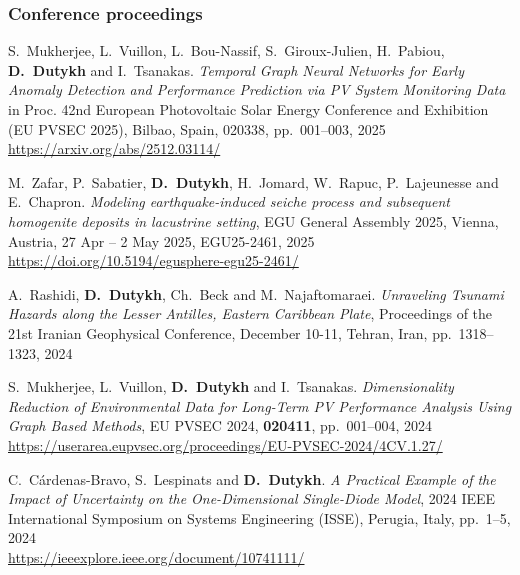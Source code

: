 \separator
\subsubsection{Conference proceedings}

\begin{etaremune}



  \item S.~Mukherjee, L.~Vuillon, L.~Bou-Nassif, S.~Giroux-Julien, H.~Pabiou, \textbf{D.~Dutykh} and I.~Tsanakas. \textit{Temporal Graph Neural Networks for Early Anomaly Detection and Performance Prediction via PV System Monitoring Data} in Proc. 42nd European Photovoltaic Solar Energy Conference and Exhibition (EU PVSEC 2025), Bilbao, Spain, 020338, pp.~001--003, 2025 \\ %
  \url{https://arxiv.org/abs/2512.03114/}

  \item M.~Zafar, P.~Sabatier, \textbf{D.~Dutykh}, H.~Jomard, W.~Rapuc, P.~Lajeunesse and E.~Chapron. \textit{Modeling earthquake-induced seiche process and subsequent homogenite deposits in lacustrine setting}, EGU General Assembly 2025, Vienna, Austria, 27 Apr -- 2 May 2025, EGU25-2461, 2025 \\ %
  \url{https://doi.org/10.5194/egusphere-egu25-2461/}
  


  \item A.~Rashidi, \textbf{D.~Dutykh}, Ch.~Beck and M.~Najaftomaraei. \textit{Unraveling Tsunami Hazards along the Lesser Antilles, Eastern Caribbean Plate}, Proceedings of the 21st Iranian Geophysical Conference, December 10-11, Tehran, Iran, pp.~1318--1323, 2024 %

  \item S.~Mukherjee, L.~Vuillon, \textbf{D.~Dutykh} and I.~Tsanakas. \textit{Dimensionality Reduction of Environmental Data for Long-Term PV Performance Analysis Using Graph Based Methods}, EU PVSEC 2024, \textbf{020411}, pp.~001--004, 2024 \\
  \url{https://userarea.eupvsec.org/proceedings/EU-PVSEC-2024/4CV.1.27/}

  \item C.~C\'ardenas-Bravo, S.~Lespinats and \textbf{D.~Dutykh}. \textit{A Practical Example of the Impact of Uncertainty on the One-Dimensional Single-Diode Model}, 2024 IEEE International Symposium on Systems Engineering (ISSE), Perugia, Italy, pp.~1--5, 2024 \\
  \url{https://ieeexplore.ieee.org/document/10741111/}


\end{etaremune}

